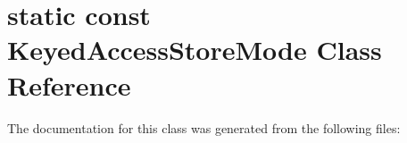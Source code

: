 \hypertarget{classstatic_01const_01KeyedAccessStoreMode}{}\section{static const Keyed\+Access\+Store\+Mode Class Reference}
\label{classstatic_01const_01KeyedAccessStoreMode}


The documentation for this class was generated from the following files\+:
